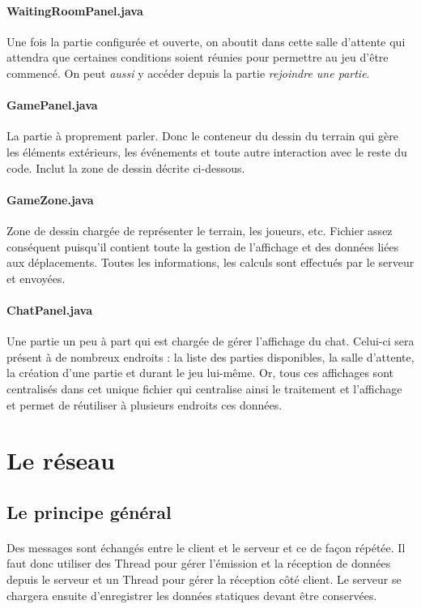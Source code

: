\documentclass[a4paper,12pt]{report}
\begin{document}
\paragraph{WaitingRoomPanel.java}
Une fois la partie configurée et ouverte, on aboutit dans cette salle d'attente qui attendra que certaines conditions soient réunies pour permettre au jeu d'être commencé. On peut \emph{aussi} y accéder depuis la partie \emph{rejoindre une partie}.
\paragraph{GamePanel.java}
La partie à proprement parler. Donc le conteneur du dessin du terrain qui gère les éléments extérieurs, les événements et toute autre interaction avec le reste du code. Inclut la zone de dessin décrite ci-dessous.
\paragraph{GameZone.java}
Zone de dessin chargée de représenter le terrain, les joueurs, etc. Fichier assez conséquent puisqu'il contient toute la gestion de l'affichage et des données liées aux déplacements. Toutes les informations, les calculs sont effectués par le serveur et envoyées.
\paragraph{ChatPanel.java}
Une partie un peu à part qui est chargée de gérer l'affichage du chat. Celui-ci sera présent à de nombreux endroits : la liste des parties disponibles, la salle d'attente, la création d'une partie et durant le jeu lui-même. Or, tous ces affichages sont centralisés dans cet unique fichier qui centralise ainsi le traitement et l'affichage et permet de réutiliser à plusieurs endroits ces données.


\section{Le réseau}
\subsection{Le principe général}
\paragraph{}
Des messages sont échangés entre le client et le serveur et ce de façon répétée. Il faut donc utiliser des Thread pour gérer l'émission et la réception de données depuis le serveur et un Thread pour gérer la réception côté client. Le serveur se chargera ensuite d'enregistrer les données statiques devant être conservées.
\end{document}
